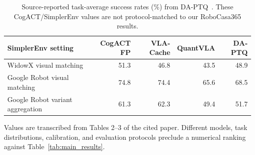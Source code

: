 \begin{table}[h!]
\centering
\caption{Source-reported task-average success rates (\%) from DA-PTQ~\cite{xu2026daptq}. These CogACT/SimplerEnv values are not protocol-matched to our RoboCasa365 results.}
\label{tab:daptq_source}
\small
\setlength{\tabcolsep}{5.0pt}
\renewcommand{\arraystretch}{1.08}
\begin{tabular}{@{}lrrrr@{}}
\toprule
SimplerEnv setting & CogACT FP & VLA-Cache & QuantVLA & DA-PTQ \\
\midrule
WidowX visual matching & 51.3 & 46.8 & 43.5 & 48.9 \\
Google Robot visual matching & 74.8 & 74.4 & 65.6 & 68.5 \\
Google Robot variant aggregation & 61.3 & 62.3 & 49.4 & 51.7 \\
\bottomrule
\end{tabular}
\vspace{2pt}
\parbox{0.99\textwidth}{\footnotesize Values are transcribed from Tables 2--3 of the cited paper. Different models, task distributions, calibration, and evaluation protocols preclude a numerical ranking against Table~\ref{tab:main_results}.}
\end{table}
